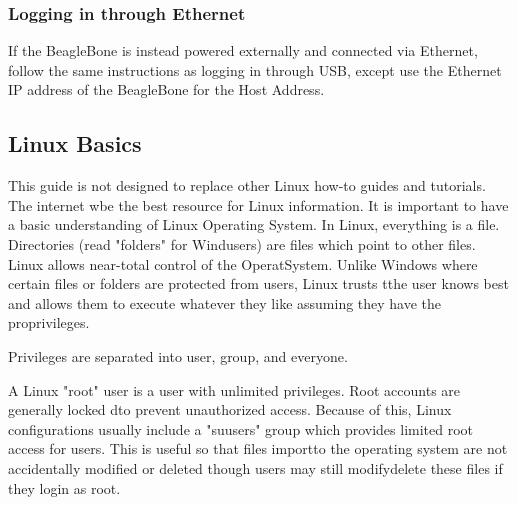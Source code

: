             \subsubsection{Logging in through Ethernet}
                If the BeagleBone is instead powered externally and connected via Ethernet, follow the same instructions as logging in through USB, except use the Ethernet IP address of the BeagleBone for the Host Address. 
    \subsection{Linux Basics}
        This guide is not designed to replace other Linux how-to guides and tutorials. The internet wbe the     best resource for Linux information. It is important to have a basic understanding of Linux Operating   System. In Linux, everything is a file. Directories (read "folders" for Windusers) are files which    point to other files. Linux allows near-total control of the OperatSystem. Unlike Windows where    certain files or folders are protected from users, Linux trusts tthe user knows best and allows them   to execute whatever they like assuming they have the proprivileges. 
        
        Privileges are separated into user, group, and everyone. 
        
        A Linux "root" user is a user with unlimited privileges. Root accounts are generally locked dto     prevent unauthorized access. Because of this, Linux configurations usually include a "suusers" group    which provides limited root access for users. This is useful so that files importto the operating  system are not accidentally modified or deleted though users may still modifydelete these files if   they login as root.

